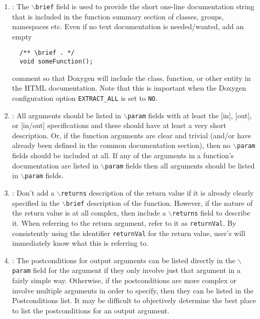 \begin{enumerate}
{}\item\DOXAddBrief: The {}\texttt{$\backslash$brief} field is used to provide
the short one-line documentation string that is included in the function
summary section of classes, groups, namespaces etc.  Even if no text
documentation is needed/wanted, add an empty
%
{\small\begin{verbatim}
  /** \brief . */
  void someFunction();
\end{verbatim}}
%
comment so that Doxygen will include the class, function, or other entity in
the HTML documentation.  Note that this is important when the Doxygen
configuration option {}\texttt{EXTRACT\-\_ALL} is set to {}\texttt{NO}.

{}\item\DOXAllOrNoneParam: All arguments should be listed in
{}\texttt{$\backslash$param} fields with at least the [in], [out], or [in/out]
specifications and these should have at least a very short description.  Or,
if the function arguments are clear and trivial (and/or have already been
defined in the common documentation section), then no
{}\texttt{$\backslash$param} fields should be included at all.  If any of the
arguments in a function's documentation are listed in
{}\texttt{$\backslash$param} fields then all arguments should be listed in
{}\texttt{$\backslash$param} fields.

{}\item\DOXReturnsOnlyIfNeeded: Don't add a {}\texttt{$\backslash$returns}
description of the return value if it is already clearly specified in the
{}\texttt{$\backslash$brief} description of the function.  However, if the
nature of the return value is at all complex, then include a
{}\texttt{$\backslash$returns} field to describe it.  When referring to the
return argument, refer to it as {}\texttt{returnVal}.  By consistently using
the identifier {}\texttt{returnVal} for the return value, user's will
immediately know what this is referring to.

{}\item\DOXPreferPostconditionsInParam: The postconditions for output
arguments can be listed directly in the {}\texttt{$\backslash$param} field for
the argument if they only involve just that argument in a fairly simple way.
Otherwise, if the postconditions are more complex or involve multiple
arguments in order to specify, then they can be listed in the Postconditions
list.  It may be difficult to objectively determine the best place to list the
postconditions for an output argument.


\end{enumerate}
